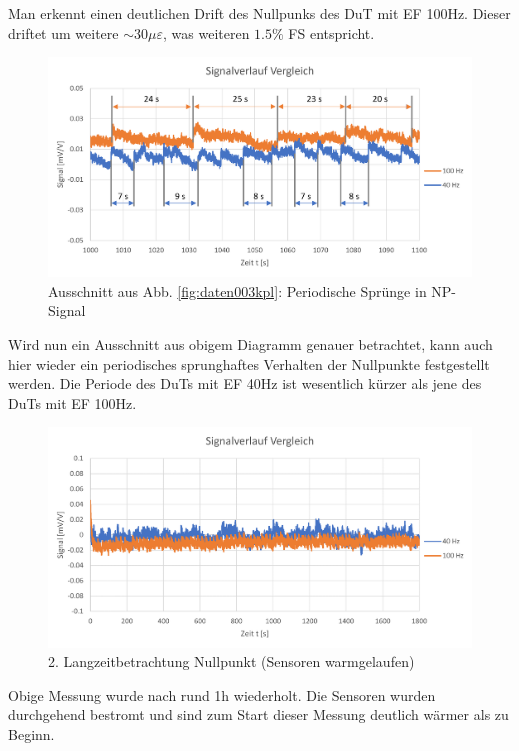 Man erkennt einen deutlichen Drift des Nullpunks des DuT mit EF 100Hz. Dieser driftet um weitere $\sim 30 \mu\varepsilon$, was weiteren $1.5\%$ FS entspricht.
\begin{figure}[H]
	\centering
	\includegraphics[width=1\linewidth]{imgs/daten_003_detail}
	\caption{Ausschnitt aus Abb. \ref{fig:daten003kpl}: Periodische Sprünge in NP-Signal}
	\label{fig:daten003detail}
\end{figure}\noindent
Wird nun ein Ausschnitt aus obigem Diagramm genauer betrachtet, kann auch hier wieder ein periodisches sprunghaftes Verhalten der Nullpunkte festgestellt werden. Die Periode des DuTs mit EF 40Hz ist wesentlich kürzer als jene des DuTs mit EF 100Hz.
\begin{figure}[H]
	\centering
	\includegraphics[width=1\linewidth]{imgs/daten_004_kpl}
	\caption{2. Langzeitbetrachtung Nullpunkt (Sensoren warmgelaufen)}
	\label{fig:daten004kpl}
\end{figure}\noindent
Obige Messung wurde nach rund 1h wiederholt. Die Sensoren wurden durchgehend bestromt und sind zum Start dieser Messung deutlich wärmer als zu Beginn.
